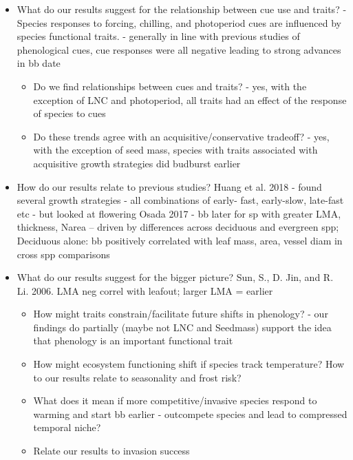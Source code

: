 \documentclass{article}\usepackage[]{graphicx}\usepackage[]{color}
\begin{document}
\begin{itemize}
\item What do our results suggest for the relationship between cue use and traits? 
- Species responses to forcing, chilling, and photoperiod cues are influenced by species functional traits. 
- generally in line with previous studies of phenological cues, cue responses were all negative leading to strong advances in bb date 
	\begin{itemize}
	\item Do we find relationships between cues and traits?
	- yes, with the exception of LNC and photoperiod, all traits had an effect of the response of species to cues
	\item Do these trends agree with an acquisitive/conservative tradeoff?
	- yes, with the exception of seed mass, species with traits associated with acquisitive growth strategies did budburst earlier
	\end{itemize}
\item How do our results relate to previous studies? 
        Huang et al. 2018 - found several growth strategies - all combinations of early- fast, early-slow, late-fast etc - but looked at flowering
        Osada 2017 - bb later for sp with greater LMA, thickness, Narea – driven by differences across deciduous and evergreen spp; 	Deciduous alone: bb positively correlated with leaf mass, area, vessel diam in cross spp comparisons
\item What do our results suggest for the bigger picture?
Sun, S., D. Jin, and R. Li. 2006. LMA neg correl with leafout; larger LMA = earlier
	\begin{itemize}
	\item How might traits constrain/facilitate future shifts in phenology?
	- our findings do partially (maybe not LNC and Seedmass) support the idea that phenology is an important functional trait
	\item How might ecosystem functioning shift if species track temperature? How to our results relate to seasonality and frost risk?
	\item What does it mean if more competitive/invasive species respond to warming and start bb earlier - outcompete species and lead to compressed temporal niche?
	\item Relate our results to invasion success 
	\end{itemize}


\end{itemize}
\end{document}
